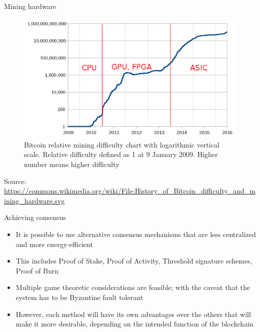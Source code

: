 \documentclass[11pt]{beamer}
\begin{document}
\begin{frame}{Mining hardware}
	\begin{figure}[]
		\centering
		\includegraphics  [scale=0.2]{Images/hardware}
		\caption{Bitcoin relative mining difficulty chart with logarithmic vertical scale. Relative difficulty defined as 1 at 9 January 2009. Higher number means higher difficulty}
	\end{figure}
	\begin{tiny}
		Source: \href{https://commons.wikimedia.org/wiki/File:History_of_Bitcoin_difficulty_and_mining_hardware.svg}{https://commons.wikimedia.org/wiki/File:History\_of\_Bitcoin\_difficulty\_and\_mining\_hardware.svg}
	\end{tiny}
\end{frame}


\begin{frame}{Achieving consensus}
	\begin{itemize}
		\item It is possible to use alternative consensus mechanisms that are less centralized and more energy-efficient
		\item This includes Proof of Stake, Proof of Activity, Threshold signature schemes, Proof of Burn
		\item Multiple game theoretic considerations are feasible; with the caveat that the system has to be Byzantine fault tolerant
		\item However, each method will have its own advantages over the others that will make it more desirable, depending on the intended function of the blockchain
	\end{itemize}
\end{frame}
\end{document}
